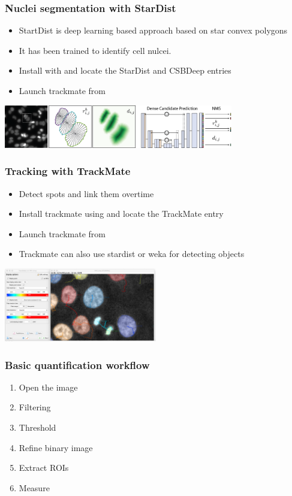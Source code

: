 \documentclass[ignorenonframetext,aspectratio=169,10pt,xcolor=table]{beamer}
\begin{document}
\begin{frame} \frametitle{Nuclei segmentation with StarDist}
  \begin{itemize}
  \item StartDist is deep learning based approach based on star convex
    polygons
  \item It has been trained to identify cell nulcei.
  \item Install with  and locate the StarDist and
    CSBDeep entries
  \item Launch trackmate from 
  \end{itemize}
  \begin{center} \includegraphics[width=0.75\textwidth]{stardist}
  \end{center}
\end{frame}

\begin{frame} \frametitle{Tracking with TrackMate}
  \begin{itemize}
  \item Detect spots and link them overtime
  \item Install trackmate using  and locate the
    TrackMate entry
  \item Launch trackmate from 
  \item Trackmate can also use stardist or weka for detecting objects
  \end{itemize}
  \begin{center} \includegraphics[width=0.5\textwidth]{trackmate}
  \end{center}
\end{frame}

\begin{frame} \frametitle{Basic quantification workflow}
  \begin{enumerate}
  \item Open the image
  \item Filtering
  \item Threshold
  \item Refine binary image
  \item Extract ROIs
  \item Measure
  \end{enumerate}
\end{frame}
\end{document}
